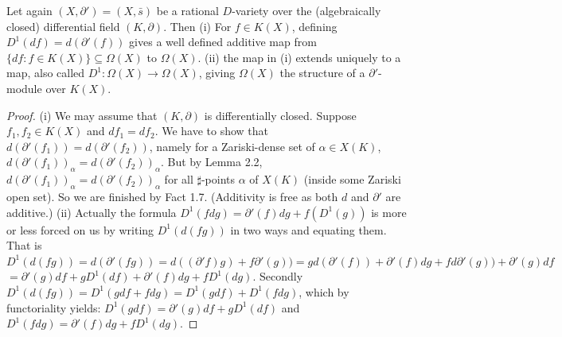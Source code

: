 \documentclass[10pt,a4paper]{amsart}
\begin{document}
\begin{Corollary} Let again $(X,\partial ') = (X,{\bar s})$ be a rational $D$-variety over the (algebraically closed) differential field $(K,\partial)$.  Then 
\newline
(i) For $f\in K(X)$, defining $D^{1}(df) = d(\partial ' (f))$ gives a well defined additive map from $\{df: f\in K(X)\}\subseteq {\Omega}(X)$ to $\Omega(X)$. 
\newline
(ii) the map in (i) extends uniquely to a map, also called $D^{1}:\Omega(X) \to \Omega(X)$, giving ${\Omega}(X)$ the structure of a $\partial '$-module over $K(X)$. 
\end{Corollary} 

\begin{proof}  (i) We may assume that $(K,\partial)$ is differentially closed. 
Suppose  $f_{1}, f_{2}\in K(X)$ and $df_{1} = df_{2}$. 
We have to show that $d(\partial ' (f_{1})) = d(\partial ' (f_{2}))$, namely for a Zariski-dense set of $\alpha\in X(K)$, $d(\partial ' (f_{1}))_{\alpha} = d(\partial ' (f_{2}))_{\alpha}$.
But by Lemma 2.2, $d(\partial ' (f_{1}))_{\alpha} = d(\partial ' (f_{2}))_{\alpha}$ for all $\sharp$-points $\alpha$ of $X(K)$ (inside some Zariski open set).  So  we are finished by Fact 1.7. 
(Additivity is free as both $d$ and $\partial '$ are additive.)
\newline
(ii)  Actually the formula  $D^{1}(fdg) = \partial '(f)dg + f(D^{1}(g))$ is more or less forced on us by writing $D^{1}(d(fg))$ in two ways and equating them.  That is
$D^{1}(d(fg)) = d(\partial '(fg)) = d((\partial ' f)g) + f{\partial '}(g)) = g d(\partial '(f)) + {\partial '} (f) dg  + fd{\partial '}(g)) + {\partial '}(g)df$
\newline
$ = {\partial '}(g)df + g D^{1}(df)   + {\partial ' }(f) dg +  fD^{1}(dg)$.
Secondly
$D^{1}(d(fg)) = D^{1}(gdf + fdg) = D^{1}(gdf) + D^{1}(fdg)$, which by functoriality yields:
\newline
$D^{1}(gdf) =  {\partial '}(g)df + g D^{1}(df)$ and
\newline
$D^{1}(fdg) =  {\partial '} (f) dg +  fD^{1}(dg)$. 

\end{proof} 
\end{document}
